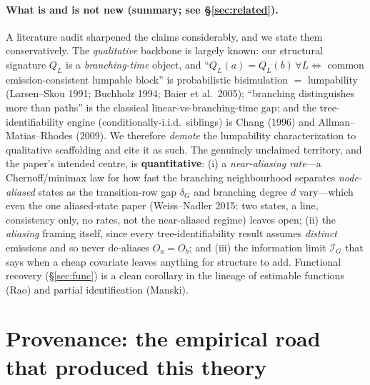 \documentclass[11pt]{article}
\begin{document}
\paragraph{What is and is not new (summary; see \S\ref{sec:related}).} A literature audit sharpened the claims
considerably, and we state them conservatively. The \emph{qualitative} backbone is largely known: our structural
signature $Q_L$ is a \emph{branching-time} object, and ``$Q_L(a)=Q_L(b)\,\forall L\iff$ common emission-consistent
lumpable block'' is probabilistic bisimulation $=$ lumpability (Larsen--Skou 1991; Buchholz 1994;
Baier et al.\ 2005); ``branching distinguishes more than paths'' is the classical linear-vs-branching-time gap;
and the tree-identifiability engine (conditionally-i.i.d.\ siblings) is Chang (1996) and Allman--Matias--Rhodes
(2009). We therefore \emph{demote} the lumpability characterization to qualitative scaffolding and cite it as
such. The genuinely unclaimed territory, and the paper's intended centre, is \textbf{quantitative}: (i) a
\emph{near-aliasing rate}---a Chernoff/minimax law for how fast the branching neighbourhood separates
\emph{node-aliased} states as the transition-row gap $\delta_G$ and branching degree $d$ vary---which even the one
aliased-state paper (Weiss--Nadler 2015: two states, a line, consistency only, no rates, not the near-aliased
regime) leaves open; (ii) the \emph{aliasing} framing itself, since every tree-identifiability result assumes
\emph{distinct} emissions and so never de-aliases $O_a=O_b$; and (iii) the information limit $\mathcal I_G$ that
says when a cheap covariate leaves anything for structure to add. Functional recovery (\S\ref{sec:func}) is a
clean corollary in the lineage of estimable functions (Rao) and partial identification (Manski).

\section{Provenance: the empirical road that produced this theory}\label{sec:provenance}
\noindent{}
\end{document}
